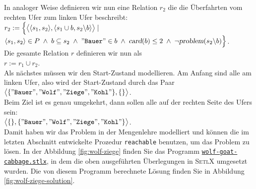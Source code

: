 In analoger Weise definieren wir nun eine Relation $r_2$ die die Überfahrten vom rechten
Ufer zum linken Ufer beschreibt:\\[0.2cm]
\hspace*{1.3cm} 
$r_2 := \Bigl\{ \bigl\langle \pair(s_1, s_2), \pair(s_1 \cup b, s_2 \backslash b)
  \bigr\rangle \;|\; $ \\
\hspace*{2.3cm} 
$\pair(s_1, s_2) \in P \;\wedge\; b \subseteq s_2 \;\wedge\;
 \squote{Bauer} \in b \;\wedge\; \textsl{card}(b) \leq 2 \;\wedge\; \neg\textsl{problem}(s_2 \backslash b) \Bigr\}$.
\\[0.2cm]
Die gesamte Relation $r$ definieren wir nun als
\\[0.2cm]
\hspace*{1.3cm} $r := r_1 \cup r_2$.\\[0.2cm]
Als n\"{a}chstes m\"{u}ssen wir den Start-Zustand modellieren.
Am Anfang sind alle am linken Ufer, also wird der Start-Zustand durch das Paar 
\\[0.3cm]
\hspace*{1.3cm}
$\bigl\langle \{ \squote{Bauer}, \squote{Wolf}, \squote{Ziege},\squote{Kohl} \}, \{\} \bigr\rangle$.
\\[0.3cm]
Beim Ziel ist es genau umgekehrt, dann sollen alle auf der rechten Seite des Ufers sein:
\\[0.3cm]
\hspace*{1.3cm}
$\bigl\langle \{\}, \{ \squote{Bauer}, \squote{Wolf}, \squote{Ziege},\squote{Kohl} \} \bigr\rangle$.
\\[0.3cm]
Damit haben wir das Problem in der Mengenlehre modelliert und k\"{o}nnen die im letzten
Abschnitt entwickelte Prozedur \texttt{reachable} benutzen, um das Problem zu l\"{o}sen.
In der Abbildung \ref{fig:wolf-ziege} finden Sie das Programm 
\href{https://github.com/karlstroetmann/Logik/blob/master/SetlX/wolf-goat-cabbage.stlx}{\texttt{wolf-goat-cabbage.stlx}},
in dem die oben ausgef\"{u}hrten Überlegungen in \textsc{SetlX} umgesetzt wurden.
Die von diesem Programm berechnete L\"{o}sung finden Sie in Abbildung \ref{fig:wolf-ziege-solution}.

